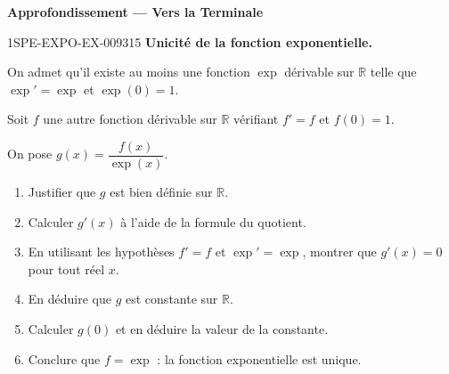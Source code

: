 \begin{center}\textbf{Approfondissement — Vers la Terminale}\end{center}
\begin{exercice}{1SPE-EXPO-EX-009}{3}{15}
\textbf{Unicité de la fonction exponentielle.}

On admet qu'il existe au moins une fonction $\exp$ dérivable sur $\mathbb{R}$ telle que $\exp' = \exp$ et $\exp(0) = 1$.

Soit $f$ une autre fonction dérivable sur $\mathbb{R}$ vérifiant $f' = f$ et $f(0) = 1$.

On pose $g(x) = \dfrac{f(x)}{\exp(x)}$.
\begin{enumerate}
\item Justifier que $g$ est bien définie sur $\mathbb{R}$.
\item Calculer $g'(x)$ à l'aide de la formule du quotient.
\item En utilisant les hypothèses $f' = f$ et $\exp' = \exp$, montrer que $g'(x) = 0$ pour tout réel $x$.
\item En déduire que $g$ est constante sur $\mathbb{R}$.
\item Calculer $g(0)$ et en déduire la valeur de la constante.
\item Conclure que $f = \exp$ : la fonction exponentielle est unique.
\end{enumerate}
\end{exercice}
